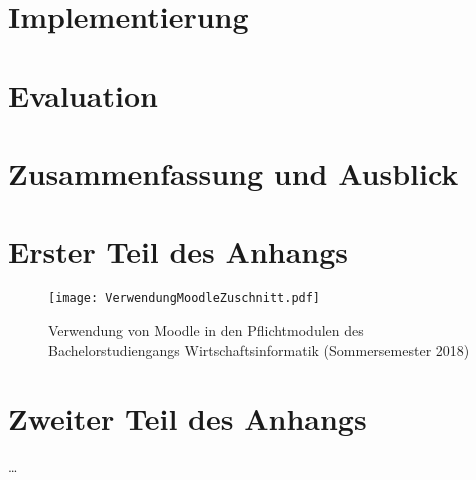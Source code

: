 \documentclass[twoside,bibliography=totoc,openany,numbers=noenddot]{fumi}
\begin{document}
\chapter{Implementierung}




\chapter{Evaluation}



\chapter{Zusammenfassung und Ausblick}



\appendix

\chapter{Erster Teil des Anhangs}
\begin{sidewaysfigure}
\texttt{[image: VerwendungMoodleZuschnitt.pdf]}
\caption{\label{fig:VerwendungMoodle} Verwendung von Moodle in den Pflichtmodulen des Bachelorstudiengangs Wirtschaftsinformatik (Sommersemester 2018)}
\end{sidewaysfigure}

\chapter{Zweiter Teil des Anhangs}
\dots




\backmatter
\pagestyle{fancyclear}



{\footnotesize\flushleft\setlength{\itemsep}{-3pt}%

}
\cleardoublepage


\listoffigures
\cleardoublepage


\listoftables
\cleardoublepage
\end{document}
